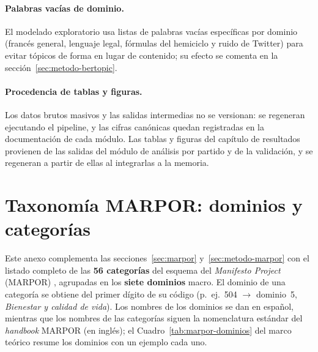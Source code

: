 \paragraph{Palabras vacías de dominio.} El modelado exploratorio usa listas de
palabras vacías específicas por dominio (francés general, lenguaje legal,
fórmulas del hemiciclo y ruido de Twitter) para evitar tópicos de forma en
lugar de contenido; su efecto se comenta en la sección~\ref{sec:metodo-bertopic}.

\paragraph{Procedencia de tablas y figuras.} Los datos brutos masivos y las
salidas intermedias no se versionan: se regeneran ejecutando el pipeline, y las
cifras canónicas quedan registradas en la documentación de cada módulo. Las
tablas y figuras del capítulo de resultados provienen de las salidas del módulo
de análisis por partido y de la validación, y se regeneran a partir de ellas al
integrarlas a la memoria.

\section{Taxonomía MARPOR: dominios y categorías}
\label{anexo:marpor}

Este anexo complementa las secciones~\ref{sec:marpor} y~\ref{sec:metodo-marpor}
con el listado completo de las \textbf{56 categorías} del esquema del
\emph{Manifesto Project} (MARPOR) \cite{marpor_mp_v5}, agrupadas en los
\textbf{siete dominios} macro. El dominio de una categoría se obtiene del primer
dígito de su código (p.\ ej.\ 504 $\rightarrow$ dominio~5, \emph{Bienestar y
calidad de vida}). Los nombres de los dominios se dan en español, mientras que los
nombres de las categorías siguen la nomenclatura estándar del \emph{handbook}
MARPOR (en inglés); el Cuadro~\ref{tab:marpor-dominios} del
marco teórico resume los dominios con un ejemplo cada uno.

